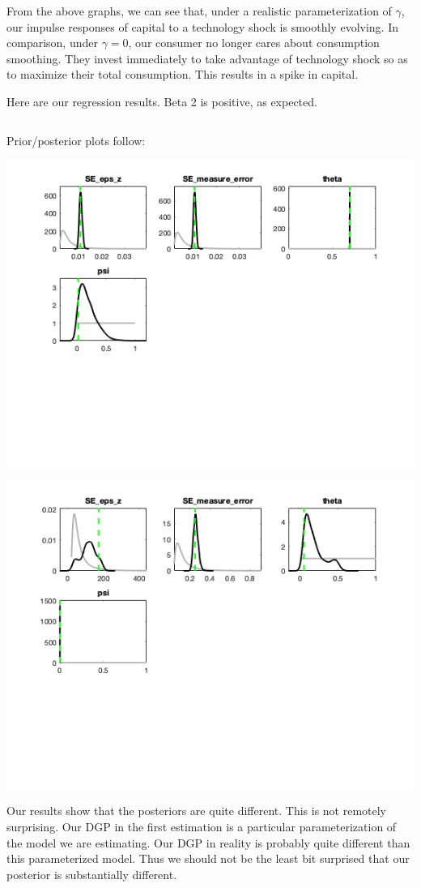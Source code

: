 \documentclass[11pt]{article} %
\begin{document}
From the above graphs, we can see that, under a realistic parameterization of $\gamma$, our impulse responses of capital to a technology shock is smoothly evolving. In comparison, under $\gamma = 0$, our consumer no longer cares about consumption smoothing. They invest immediately to take advantage of technology shock so as to maximize their total consumption. This results in a spike in capital.

Here are our regression results. Beta 2 is positive, as expected.
\begin{center}
\begin{tabular}{c|c}
\hline \hline

\hline \hline
\end{tabular}
\end{center}

Prior/posterior plots follow:

\begin{center}
\includegraphics[scale=0.5]{fig3}

\includegraphics[scale=0.5]{fig4}
\end{center}

Our results show that the posteriors are quite different. This is not remotely surprising. Our DGP in the first estimation is a particular parameterization of the model we are estimating. Our DGP in reality is probably quite different than this parameterized model. Thus we should not be the least bit surprised that our posterior is substantially different.
\end{document}
